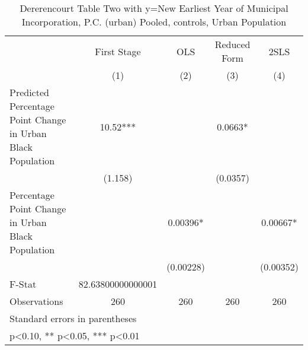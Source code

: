 \begin{table}[htbp]\centering
\def\sym#1{\ifmmode^{#1}\else\(^{#1}\)\fi}
\caption{Dererencourt Table Two with y=New Earliest Year of Municipal Incorporation, P.C. (urban)  Pooled,  controls, Urban Population}
\begin{tabular}{l*{4}{c}}
\toprule
                    & First Stage   &         OLS   &Reduced Form   &        2SLS   \\
                    &\multicolumn{1}{c}{(1)}   &\multicolumn{1}{c}{(2)}   &\multicolumn{1}{c}{(3)}   &\multicolumn{1}{c}{(4)}   \\
\midrule
Predicted Percentage Point Change in Urban Black Population&       10.52***&               &      0.0663*  &               \\
                    &     (1.158)   &               &    (0.0357)   &               \\
\addlinespace
Percentage Point Change in Urban Black Population&               &     0.00396*  &               &     0.00667*  \\
                    &               &   (0.00228)   &               &   (0.00352)   \\
\midrule
F-Stat              &82.63800000000001   &               &               &               \\
Observations        &         260   &         260   &         260   &         260   \\
\bottomrule
\multicolumn{5}{l}{\footnotesize Standard errors in parentheses}\\
\multicolumn{5}{l}{\footnotesize * p<0.10, ** p<0.05, *** p<0.01}\\
\end{tabular}
\end{table}
